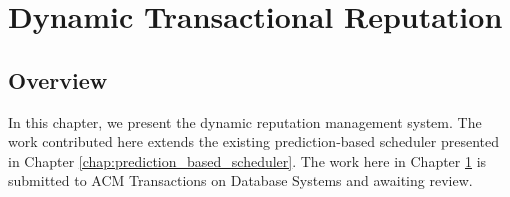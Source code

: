 \chapter{Dynamic Transactional Reputation }
\label{chap:dynamic_reputation}

\section{Overview}
\label{drp:overview}
In this chapter, we present the dynamic reputation management system. The work contributed here extends the existing prediction-based scheduler presented in Chapter \ref{chap:prediction_based_scheduler}. The work here in Chapter \ref{chap:dynamic_reputation} is submitted to ACM Transactions on Database Systems and awaiting review.








